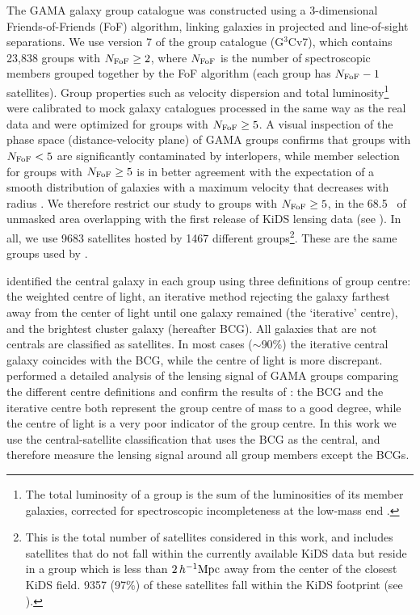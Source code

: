 The GAMA galaxy group catalogue was constructed using a 3-dimensional Friends-of-Friends (FoF) 
algorithm, linking galaxies in projected and line-of-sight separations. We use version 7 of the 
group catalogue (G$^3$Cv7), which contains 23,838 groups with $N_{\rm FoF}\geq2$, where $N_{\rm 
FoF}$ is the number of spectroscopic members grouped together by the FoF algorithm (each group has 
$N_{\rm FoF}-1$ satellites). Group properties such as velocity dispersion and total 
luminosity\footnote{The total luminosity of a group is the sum of the luminosities of its member 
galaxies, corrected for spectroscopic incompleteness at the low-mass end \citep[see][]{robotham11}.} 
were calibrated to mock galaxy catalogues processed in the same way as the real data and were 
optimized for groups with $N_{\rm FoF}\geq5$. A visual inspection of the phase space 
(distance-velocity plane) of GAMA groups confirms that groups with $N_{\rm FoF}<5$ are 
significantly contaminated by interlopers, while member selection for groups with $N_{\rm 
FoF}\geq5$ is in better agreement with the expectation of a smooth distribution of galaxies with a 
maximum velocity that decreases with radius \citep[e.g.,][]{mamon10}. We therefore restrict our 
study to groups with $N_{\rm FoF}\geq5$, in the 68.5 \sqdeg\ of unmasked area overlapping with the 
first release of KiDS lensing data (see ). In all, we use 9683 satellites hosted by 
1467 different groups\footnote{This is the total number of satellites considered in this work, and 
includes satellites that do not fall within the currently available KiDS data but reside in a group 
which is less than $2\,h^{-1}{\rm Mpc}$ away from the center of the closest KiDS field. 9357 (97\%) 
of these satellites fall within the KiDS footprint (see ).}. These are the same 
groups used by \cite{viola15}.

\cite{robotham11} identified the central galaxy in each group using three definitions of group 
centre: the weighted centre of light, an iterative method rejecting the galaxy farthest away from 
the center of light until one galaxy remained (the `iterative' centre), and the brightest cluster 
galaxy (hereafter BCG). All galaxies that are not centrals are classified as satellites. In most 
cases ($\sim$90\%) the iterative central galaxy coincides with the BCG, while the centre of light 
is more discrepant. \cite{viola15} performed a detailed analysis of the lensing signal of GAMA 
groups comparing the different centre definitions and confirm the results of \cite{robotham11}: the 
BCG and the iterative centre both represent the group centre of mass to a good degree, while the 
centre of light is a very poor indicator of the group centre. In this work we use the 
central-satellite classification that uses the BCG as the central, and therefore measure the 
lensing signal around all group members except the BCGs.


